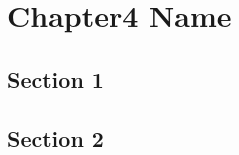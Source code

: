 
\chapter{Chapter4 Name} %
\label{ch:chapter4}
\lipsum[50]

\section{Section 1}
\lipsum[50]

\section{Section 2}
\lipsum[50]
